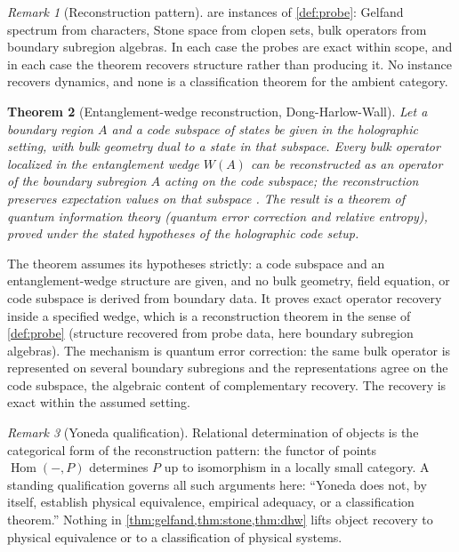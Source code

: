 \documentclass[11pt,letterpaper]{article}
\newtheorem{theorem}{Theorem}[section]
\theoremstyle{definition}
\theoremstyle{remark}
\newtheorem{remark}[theorem]{Remark}
\begin{document}
\begin{remark}[Reconstruction pattern]
\label{rem:pattern}
 are instances of \cref{def:probe}: Gelfand spectrum from characters, Stone space from clopen sets, bulk operators from boundary subregion algebras. In each case the probes are exact within scope, and in each case the theorem recovers structure rather than producing it. No instance recovers dynamics, and none is a classification theorem for the ambient category.
\end{remark}

\begin{theorem}[Entanglement-wedge reconstruction, Dong-Harlow-Wall]
\label{thm:dhw}
Let a boundary region $A$ and a code subspace of states be given in the holographic setting, with bulk geometry dual to a state in that subspace. Every bulk operator localized in the entanglement wedge $W(A)$ can be reconstructed as an operator of the boundary subregion $A$ acting on the code subspace; the reconstruction preserves expectation values on that subspace \cite{dhw}. The result is a theorem of quantum information theory (quantum error correction and relative entropy), proved under the stated hypotheses of the holographic code setup.
\end{theorem}

The theorem assumes its hypotheses strictly: a code subspace and an entanglement-wedge structure are given, and no bulk geometry, field equation, or code subspace is derived from boundary data. It proves exact operator recovery inside a specified wedge, which is a reconstruction theorem in the sense of \cref{def:probe} (structure recovered from probe data, here boundary subregion algebras). The mechanism is quantum error correction: the same bulk operator is represented on several boundary subregions and the representations agree on the code subspace, the algebraic content of complementary recovery. The recovery is exact within the assumed setting.

\begin{remark}[Yoneda qualification]
\label{rem:yoneda}
Relational determination of objects is the categorical form of the reconstruction pattern: the functor of points $\operatorname{Hom}(-, P)$ determines $P$ up to isomorphism in a locally small category. A standing qualification governs all such arguments here: ``Yoneda does not, by itself, establish physical equivalence, empirical adequacy, or a classification theorem.'' Nothing in \cref{thm:gelfand,thm:stone,thm:dhw} lifts object recovery to physical equivalence or to a classification of physical systems.
\end{remark}
\end{document}
